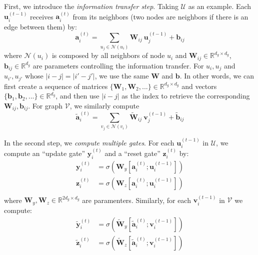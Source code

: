 \documentclass[11pt,a4paper]{article}
\begin{document}
First, we introduce the \textit{information transfer step}. Taking $\mathcal{U}$ as an example. Each $\bm u_i^{(t-1)}$ receives $\bm a_i^{(t)}$ from its neighbors (two nodes are neighbors if there is an edge between them) by:
\begin{equation} \label{Eq:first}
\bm a^{(t)}_i = \sum_{u_j \in \mathcal{N}(u_i)} \bm W_{ij} ~ \bm u^{(t-1)}_j + \bm b_{ij} 
\end{equation}
where $\mathcal{N}(u_i)$ is composed by all neighbors of node $u_i$ and $\bm{W}_{ij} \in \mathbb{R}^{d_g \times d_g}$, $\bm{b}_{ij} \in \mathbb{R}^{d_g}$ are parameters controlling the information transfer. For $u_i, u_j$ and $u_{i'}, u_{j'}$ whose $|i-j| = |i'- j'|$, we use the same $\bm{W}$ and $\bm{b}$. In other words, we can first create a sequence of matrices $\{\bm{W}_1, \bm{W}_2, ...\} \in \mathbb{R}^{d_g \times d_g}$ and vectors $\{\bm{b}_1, \bm{b}_2, ...\} \in \mathbb{R}^{d_g}$, and then use $|i-j|$ as the index to retrieve the corresponding $\bm W_{ij}, \bm b_{ij}$. For graph $\mathcal{V}$, we similarly compute
\begin{equation} 
\tilde{\bm a}^{(t)}_i = \sum_{v_j \in \mathcal{N}(v_i)} \tilde{\bm W}_{ij} ~ \bm v^{(t-1)}_j + \tilde{\bm b}_{ij}
\end{equation}

In the second step, we \textit{compute multiple gates}. For each $\bm u_i^{(t-1)}$ in $\mathcal{U}$, we compute an ``update gate'' $\bm y_i^{(t)}$ and a ``reset gate'' $\bm z_i^{(t)}$ by:
\begin{equation}
\begin{split}
\bm y_i^{(t)} &= \sigma (\bm W_y [\bm a_i^{(t)}; \bm u_i^{(t-1)}]) \\
\bm z_i^{(t)} &= \sigma (\bm W_z [\bm a_i^{(t)}; \bm u_i^{(t-1)}]) \\
\end{split}
\end{equation}
where $\bm W_y, \bm W_z \in \mathbb{R}^{2 d_g \times d_g}$ are paramenters. Similarly, for each $\bm v_i^{(t-1)}$ in $\mathcal{V}$ we compute:
\begin{equation}
\begin{split}
\tilde{\bm y}_i^{(t)} &= \sigma (\tilde{\bm W}_y [\tilde{\bm a}_i^{(t)}; \bm v_i^{(t-1)}]) \\
\tilde{\bm z}_i^{(t)} &= \sigma (\tilde{\bm W}_z [\tilde{\bm a}_i^{(t)}; \bm v_i^{(t-1)}])
\end{split}
\end{equation}
\end{document}
